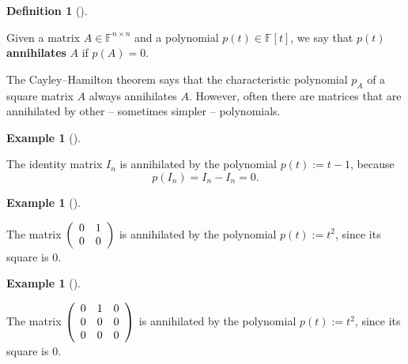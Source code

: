 \documentclass[numbers=enddot,12pt,final,onecolumn,notitlepage]{scrartcl}%
\numberwithin{exer}{subsection}
\theoremstyle{definition}
\newtheorem{defi}[theo]{Definition}
\newenvironment{definition}[1][]
{\begin{defi}[#1]\begin{leftbar}}
{\end{leftbar}\end{defi}}
\newtheorem{exam}[theo]{Example}
\newenvironment{example}[1][]
{\begin{exam}[#1]\begin{leftbar}}
{\end{leftbar}\end{exam}}
\begin{document}
\begin{definition}
\label{def.jnf.mipo.annih}Given a matrix $A\in\mathbb{F}^{n\times n}$ and a
polynomial $p\left(  t\right)  \in\mathbb{F}\left[  t\right]  $, we say that
$p\left(  t\right)  $ \textbf{annihilates} $A$ if $p\left(  A\right)  =0$.
\end{definition}

The Cayley--Hamilton theorem says that the characteristic polynomial $p_{A}$
of a square matrix $A$ always annihilates $A$. However, often there are
matrices that are annihilated by other -- sometimes simpler -- polynomials.

\begin{example}
The identity matrix $I_{n}$ is annihilated by the polynomial $p\left(
t\right)  :=t-1$, because%
\[
p\left(  I_{n}\right)  =I_{n}-I_{n}=0.
\]

\end{example}

\begin{example}
The matrix $\left(
\begin{array}
[c]{cc}%
0 & 1\\
0 & 0
\end{array}
\right)  $ is annihilated by the polynomial $p\left(  t\right)  :=t^{2}$,
since its square is $0$.
\end{example}

\begin{example}
The matrix $\left(
\begin{array}
[c]{ccc}%
0 & 1 & 0\\
0 & 0 & 0\\
0 & 0 & 0
\end{array}
\right)  $ is annihilated by the polynomial $p\left(  t\right)  :=t^{2}$,
since its square is $0$.
\end{example}
\end{document}

